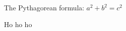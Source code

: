 
\newcommand{\DT}{{\mathbb S}}
\begin{theorem}
The Pythagorean formula: $a^2 + b^2 = c^2$
\end{theorem}
Ho ho ho

